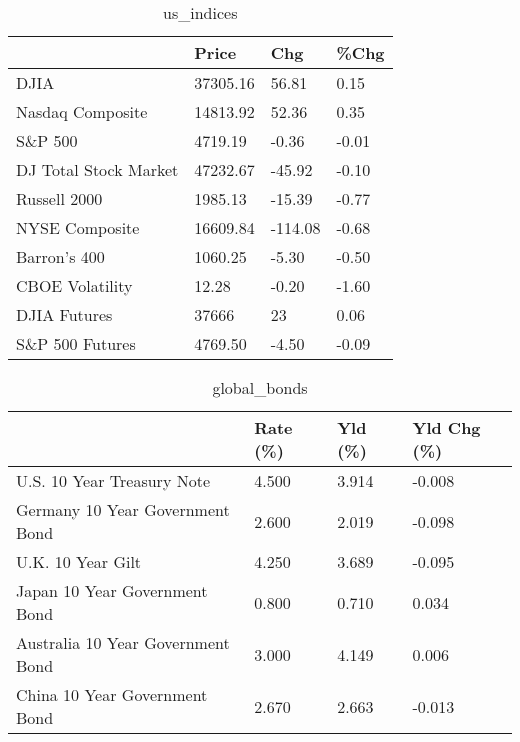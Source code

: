 \documentclass{article}%
\begin{document}
%


\begin{table}[htbp]%
\caption{us\_indices}%
\centering%
\begin{adjustbox}{width=1\textwidth}%
\begin{tabular}{llll}
\toprule
                      &    Price &     Chg &  \%Chg \\
\midrule
                 DJIA & 37305.16 &   56.81 &  0.15 \\
     Nasdaq Composite & 14813.92 &   52.36 &  0.35 \\
              S\&P 500 &  4719.19 &   -0.36 & -0.01 \\
DJ Total Stock Market & 47232.67 &  -45.92 & -0.10 \\
         Russell 2000 &  1985.13 &  -15.39 & -0.77 \\
       NYSE Composite & 16609.84 & -114.08 & -0.68 \\
         Barron's 400 &  1060.25 &   -5.30 & -0.50 \\
      CBOE Volatility &    12.28 &   -0.20 & -1.60 \\
         DJIA Futures &    37666 &      23 &  0.06 \\
      S\&P 500 Futures &  4769.50 &   -4.50 & -0.09 \\
\bottomrule
\end{tabular}
%
\end{adjustbox}%
\end{table}

%


\begin{table}[htbp]%
\caption{global\_bonds}%
\centering%
\begin{adjustbox}{width=1\textwidth}%
\begin{tabular}{llll}
\toprule
                                  & Rate (\%) & Yld (\%) & Yld Chg (\%) \\
\midrule
       U.S. 10 Year Treasury Note &    4.500 &   3.914 &      -0.008 \\
  Germany 10 Year Government Bond &    2.600 &   2.019 &      -0.098 \\
                U.K. 10 Year Gilt &    4.250 &   3.689 &      -0.095 \\
    Japan 10 Year Government Bond &    0.800 &   0.710 &       0.034 \\
Australia 10 Year Government Bond &    3.000 &   4.149 &       0.006 \\
    China 10 Year Government Bond &    2.670 &   2.663 &      -0.013 \\
\bottomrule
\end{tabular}
%
\end{adjustbox}%
\end{table}
\end{document}
